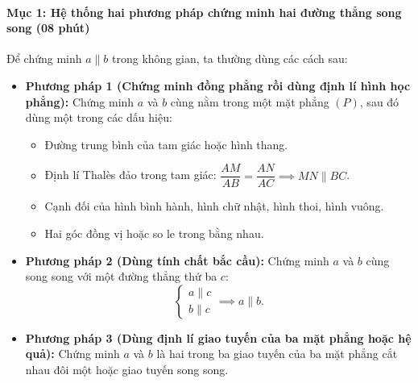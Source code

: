 \documentclass[12pt, a4paper]{article}
\begin{document}
\paragraph{Mục 1: Hệ thống hai phương pháp chứng minh hai đường thẳng song song (08 phút)}
Để chứng minh $a \parallel b$ trong không gian, ta thường dùng các cách sau:
\begin{itemize}
    \item \textbf{Phương pháp 1 (Chứng minh đồng phẳng rồi dùng định lí hình học phẳng):}
    Chứng minh $a$ và $b$ cùng nằm trong một mặt phẳng $(P)$, sau đó dùng một trong các dấu hiệu:
    \begin{itemize}
        \item Đường trung bình của tam giác hoặc hình thang.
        \item Định lí Thalès đảo trong tam giác: $\dfrac{AM}{AB} = \dfrac{AN}{AC} \implies MN \parallel BC$.
        \item Cạnh đối của hình bình hành, hình chữ nhật, hình thoi, hình vuông.
        \item Hai góc đồng vị hoặc so le trong bằng nhau.
    \end{itemize}
    \item \textbf{Phương pháp 2 (Dùng tính chất bắc cầu):}
    Chứng minh $a$ và $b$ cùng song song với một đường thẳng thứ ba $c$:
    $$\begin{cases} a \parallel c \\ b \parallel c \end{cases} \implies a \parallel b.$$
    \item \textbf{Phương pháp 3 (Dùng định lí giao tuyến của ba mặt phẳng hoặc hệ quả):}
    Chứng minh $a$ và $b$ là hai trong ba giao tuyến của ba mặt phẳng cắt nhau đôi một hoặc giao tuyến song song.
\end{itemize}
\end{document}
